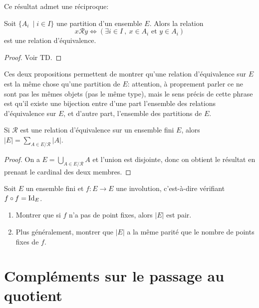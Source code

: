 Ce résultat admet une \og réciproque\fg : 

\begin{proposition}
Soit $\{A_i\:\mid i\in I\}$ une partition d'un ensemble $E$. Alors la relation
\[
x\mathcal R y \iff \left( \exists i\in I\:,\: x\in A_i\text{ et } y\in A_i\right)
\]
est une relation d'équivalence.
\end{proposition}
\begin{proof}
Voir TD.
\end{proof}

Ces deux propositions permettent de montrer qu'\og une relation d'équivalence sur $E$ est la même chose qu'une partition de $E$\fg : attention, à proprement parler ce ne sont pas les mêmes objets (pas le même type), mais le sens précis de cette phrase est qu'il existe une bijection entre d'une part l'ensemble des relations d'équivalence sur $E$, et d'autre part, l'ensemble des partitions de $E$.

\begin{corollaire}
Si $\mathcal R$ est une relation d'équivalence sur un ensemble fini $E$, alors $|E| = \sum_{A\in E/\mathcal R} |A|$.
\end{corollaire}
\begin{proof}
On a  $E= \bigcup_{A\in E/\mathcal R} A$ et l'union est disjointe, donc on obtient le résultat en prenant le cardinal des deux membres.
\end{proof}


\begin{exercice}
Soit $E$ un ensemble fini et $f : E\to E$ une involution, c'est-à-dire vérifiant $f\circ f = \operatorname{Id}_E$.
\begin{enumerate}
\item Montrer que si $f$ n'a pas de point fixes, alors $|E|$ est pair.
\item Plus généralement, montrer que $|E|$ a la même parité que le nombre de points fixes de $f$.
\end{enumerate}
\end{exercice}

\section{Compléments sur le passage au quotient}

